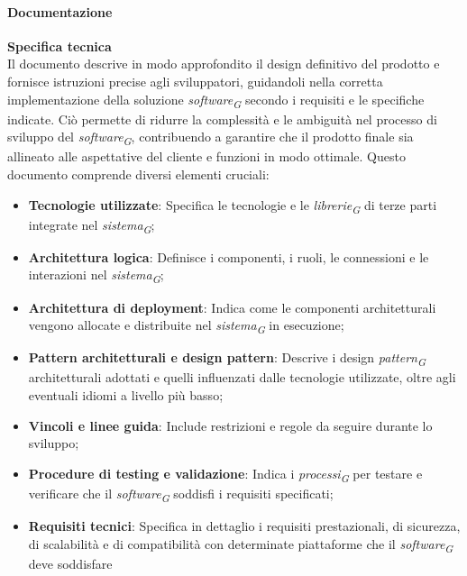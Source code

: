 \paragraph{Documentazione}
\textbf{Specifica tecnica} \\
Il documento descrive in modo approfondito il design definitivo del prodotto e fornisce istruzioni precise agli sviluppatori, guidandoli nella corretta implementazione della soluzione \textit{software}\textsubscript{\textit{G}} secondo i requisiti e le specifiche indicate. Ciò permette di ridurre la complessità e le ambiguità nel processo di sviluppo del \textit{software}\textsubscript{\textit{G}}, contribuendo a garantire che il prodotto finale sia allineato alle aspettative del cliente e funzioni in modo ottimale.
Questo documento comprende diversi elementi cruciali: 
\begin{itemize}
    \item \textbf{Tecnologie utilizzate}: Specifica le tecnologie e le \textit{librerie}\textsubscript{\textit{G}} di terze parti integrate nel \textit{sistema}\textsubscript{\textit{G}};
    \item \textbf{Architettura logica}: Definisce i componenti, i ruoli, le connessioni e le interazioni nel \textit{sistema}\textsubscript{\textit{G}};
    \item \textbf{Architettura di deployment}: Indica come le componenti architetturali vengono allocate e distribuite nel \textit{sistema}\textsubscript{\textit{G}} in esecuzione;
    \item \textbf{Pattern architetturali e design pattern}: Descrive i design \textit{pattern}\textsubscript{\textit{G}} architetturali adottati e quelli influenzati dalle tecnologie utilizzate, oltre agli eventuali idiomi a livello più basso;
    \item \textbf{Vincoli e linee guida}: Include restrizioni e regole da seguire durante lo sviluppo;
    \item \textbf{Procedure di testing e validazione}: Indica i \textit{processi}\textsubscript{\textit{G}} per testare e verificare che il \textit{software}\textsubscript{\textit{G}} soddisfi i requisiti specificati;
    \item \textbf{Requisiti tecnici}: Specifica in dettaglio i requisiti prestazionali, di sicurezza, di scalabilità e di compatibilità con determinate piattaforme che il \textit{software}\textsubscript{\textit{G}} deve soddisfare
\end{itemize}

